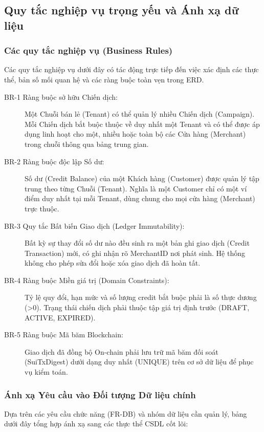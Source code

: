\subsection{Quy tắc nghiệp vụ trọng yếu và Ánh xạ dữ liệu}

\subsubsection{Các quy tắc nghiệp vụ (Business Rules)}
Các quy tắc nghiệp vụ dưới đây có tác động trực tiếp đến việc xác định các thực thể, bản số mối quan hệ và các ràng buộc toàn vẹn trong ERD.

\begin{description}
    \item[BR-1 Ràng buộc sở hữu Chiến dịch:] Một Chuỗi bán lẻ (Tenant) có thể quản lý nhiều Chiến dịch (Campaign). Mỗi Chiến dịch bắt buộc thuộc về duy nhất một Tenant và có thể được áp dụng linh hoạt cho một, nhiều hoặc toàn bộ các Cửa hàng (Merchant) trong chuỗi thông qua bảng trung gian.
    
    \item[BR-2 Ràng buộc độc lập Số dư:] Số dư (Credit Balance) của một Khách hàng (Customer) được quản lý tập trung theo từng Chuỗi (Tenant). Nghĩa là một Customer chỉ có một ví điểm duy nhất tại mỗi Tenant, dùng chung cho mọi cửa hàng (Merchant) trực thuộc.
    
    \item[BR-3 Quy tắc Bất biến Giao dịch (Ledger Immutability):] Bất kỳ sự thay đổi số dư nào đều sinh ra một bản ghi giao dịch (Credit Transaction) mới, có ghi nhận rõ MerchantID nơi phát sinh. Hệ thống không cho phép sửa đổi hoặc xóa giao dịch đã hoàn tất.
    
    \item[BR-4 Ràng buộc Miền giá trị (Domain Constraints):] Tỷ lệ quy đổi, hạn mức và số lượng credit bắt buộc phải là số thực dương (>0). Trạng thái chiến dịch phải thuộc tập giá trị định trước (DRAFT, ACTIVE, EXPIRED).
    
    \item[BR-5 Ràng buộc Mã băm Blockchain:] Giao dịch đã đồng bộ On-chain phải lưu trữ mã băm đối soát (SuiTxDigest) dưới dạng duy nhất (UNIQUE) trên cơ sở dữ liệu để phục vụ kiểm toán.
\end{description}

\subsubsection{Ánh xạ Yêu cầu vào Đối tượng Dữ liệu chính}
Dựa trên các yêu cầu chức năng (FR-DB) và nhóm dữ liệu cần quản lý, bảng dưới đây tổng hợp ánh xạ sang các thực thể CSDL cốt lõi:

